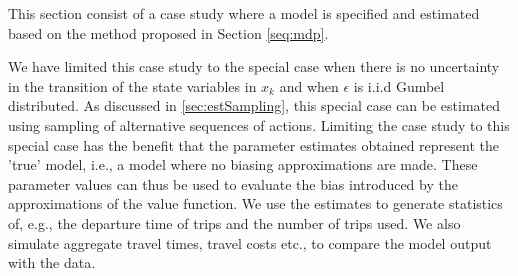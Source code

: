 \newcommand{\cost}{\text{cost}}
\newcommand{\car}{\text{car}}
\newcommand{\pt}{\text{PT}}
\newcommand{\walk}{\text{walk}}
\newcommand{\bike}{\text{bike}}
\newcommand{\hi}{\text{h.i}}
\newcommand{\wait}{\text{wait}}
\newcommand{\geqfive}{\text{s.z.,walk}}
\newcommand{\mc}{\theta}
\newcommand{\ac}{C}
\newcommand{\acp}{\theta}
\newcommand{\dura}[1]{\Delta t_#1}
\newcommand{\TT}{TT}
\newcommand{\ustay}{\avgu_\text{stay}}
\newcommand{\stay}{\text{stay}}

\newcommand{\p}[1]{p_{\text{#1}}}
\newcommand{\m}[1]{m_{\text{#1}}}
\newcommand{\amemm}[1]{\amem_\text{#1}}
\newcommand{\dummy}[1]{\delta_{#1}}

This section consist of a case study where a model is specified and estimated based on the method proposed in Section \ref{seq:mdp}. 

We have limited this case study to the special case when there is no uncertainty in the transition of the state variables in $x_k$ and when $\epsilon$ is i.i.d Gumbel distributed. As discussed in \ref{sec:estSampling}, this special case can be estimated using sampling of alternative sequences of actions. Limiting the case study to this special case has the benefit that the parameter estimates obtained represent the 'true' model, i.e., a model where no biasing approximations are made. These parameter values can thus be used to evaluate the bias introduced by the approximations of the value function.
We use the estimates to generate statistics of, e.g., the departure time of trips and the number of trips used. We also simulate aggregate travel times, travel costs etc., to compare the model output with the data. 

